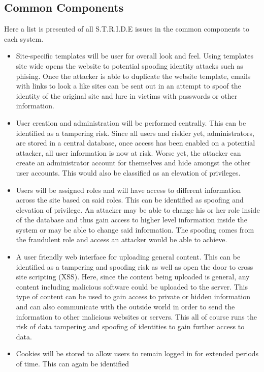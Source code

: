 \documentclass[paper=a4, fontsize=11pt]{scrartcl} %
\numberwithin{equation}{section} %
\numberwithin{figure}{section} %
\numberwithin{table}{section} %
\begin{document}
\subsection{Common Components}
Here a list is presented of all S.T.R.I.D.E issues in the common components to each system.

\begin{itemize}
\item Site-specific templates will be user for overall look and feel. Using templates site wide opens the website to potential
spoofing identity attacks such as phising. Once the attacker is able to duplicate the website template, emails with links to
look a like sites can be sent out in an attempt to spoof the identity of the original site and lure in victims with passwords
or other information.
\item User creation and administration will be performed centrally. This can be identified as a tampering risk. Since all users
and riskier yet, administrators, are stored in a central database, once access has been enabled on a potential attacker, all
user information is now at risk. Worse yet, the attacker can create an administrator account for themselves and hide amongst the
other user accounts. This would also be classified as an elevation of privileges.
\item Users will be assigned roles and will have access to different information across the site based on said roles. This can
be identified as spoofing and elevation of privilege. An attacker may be able to change his or her role inside of the database
and thus gain access to higher level information inside the system or may be able to change said information. The spoofing comes
from the fraudulent role and access an attacker would be able to achieve.
\item A user friendly web interface for uploading general content. This can be identified as a tampering and spoofing risk as
well as open the door to cross site scripting (XSS). Here, since the content being uploaded is general, any content including
malicious software could be uploaded to the server. This type of content can be used to gain access to private or hidden information
and can also communicate with the outside world in order to send the information to other malicious websites or servers. This 
all of course runs the risk of data tampering and spoofing of identities to gain further access to data.
\item Cookies will be stored to allow users to remain logged in for extended periods of time. This can again be identified

\end{itemize}
\end{document}
